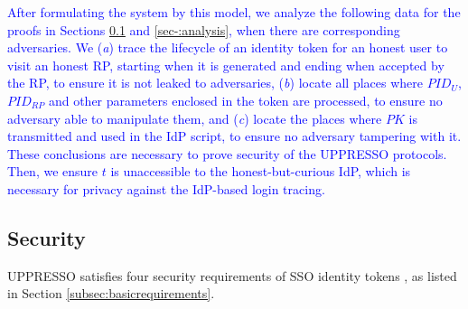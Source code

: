 

\textcolor{blue}{After formulating the system by this model,
    we analyze the following data for the proofs in Sections \ref{analysis-security} and \ref{sec-:analysis},
     when there are corresponding adversaries.
We (\emph{a}) trace the lifecycle of an identity token for an honest user to visit an honest RP,
        starting when it is generated and ending when accepted by the RP,
    to ensure it is not leaked to adversaries,
(\emph{b}) 
    locate all places
        where $PID_U$, $PID_{RP}$ and other parameters enclosed in the token are processed,
     to ensure no adversary able to manipulate them,
and (\emph{c})
    locate the places where $PK$ is transmitted and used in the IdP script,
        to ensure no adversary tampering with it.
These conclusions are necessary to prove security of the UPPRESSO protocols.
%
Then,
        we ensure $t$ is unaccessible to the honest-but-curious IdP,
 which is necessary for privacy against the IdP-based login tracing.}





\subsection{Security}
\label{analysis-security}
UPPRESSO satisfies four security requirements of SSO identity tokens \cite{ArmandoCCCT08,FettKS16, FettKS17},
     as listed in Section \ref{subsec:basicrequirements}.

